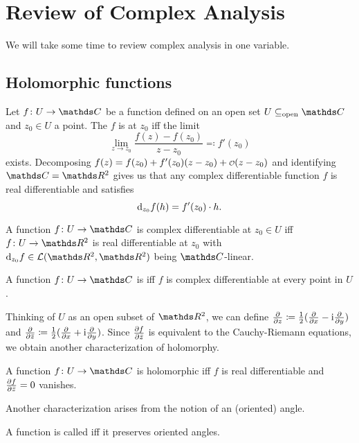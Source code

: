 \chapter{Review of Complex Analysis}

We will take some time to review complex analysis in one variable.

\section{Holomorphic functions}

Let \(f\colon U \to \C\) be a function
defined on an open set \(U \subsetopen \C\)
and \(z_0 \in U\) a point.
The \(f\) is  at \(z_0\)
iff the limit
\[\lim_{z\to z_0} \frac{f(z) - f(z_0)}{z - z_0} \eqqcolon f'(z_0)\]
exists.
Decomposing \(f(z) = f(z_0) + f'(z_0)(z-z_0) + \landauo(z-z_0)\)
and identifying \(\C = \R^2\)
gives us that any complex differentiable function \(f\) is real differentiable
and satisfies \[\diff_{z_0}f(h) = f'(z_0)\cdot h.\]

\begin{prop}
	A function \(f\colon U \to \C\) is complex differentiable
	at \(z_0 \in U\)
	iff \(f\colon U \to \R^2\) is real differentiable at \(z_0\)
	with \(\diff_{z_0}f \in \lin(\R^2, \R^2)\) being \(\C\)-linear.
\end{prop}

\begin{defi}
	A function \(f\colon U \to \C\) is 
	iff \(f\) is complex differentiable at every point in \(U\).
\end{defi}

Thinking of \(U\) as an open subset of \(\R^2\),
we can define \(\partq z \coloneqq \frac12(\partq x - \i\partq y)\)
and \(\partq{\bar z} \coloneqq \frac12(\partq x + \i\partq y)\).
Since \(\partq[f]{\bar z}\) is equivalent to the Cauchy-Riemann equations,
we obtain another characterization of holomorphy.

\begin{prop}
	A function \(f\colon U \to \C\) is holomorphic
	iff \(f\) is real differentiable
	and \(\partq[f]{\bar z} = 0\) vanishes.
\end{prop}

Another characterization arises from the notion of an (oriented) angle.

\begin{defi}
	A function is called  iff it preserves oriented angles.
\end{defi}

